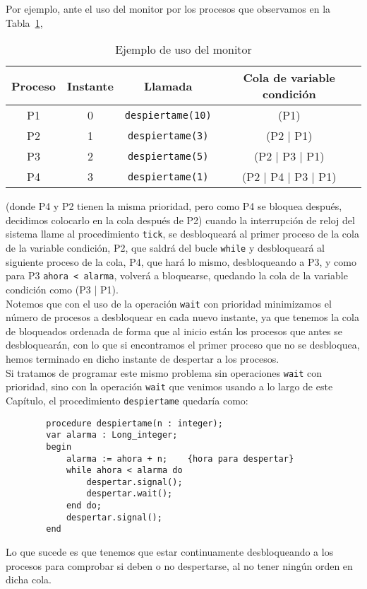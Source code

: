 \begin{ejemplo}
    Por ejemplo, ante el uso del monitor por los procesos que observamos en la Tabla~\ref{tab:ejm_uso_monitor},
    \begin{table}
    \centering
    \begin{tabular}{|c|c|c|c|}
        \hline
        Proceso & Instante & Llamada & Cola de variable condición \\
        \hline
        P1 & 0 & \verb|despiertame(10)| & (P1) \\
        \hline
        P2 & 1 & \verb|despiertame(3)| & (P2 | P1) \\
        \hline
        P3 & 2 & \verb|despiertame(5)| & (P2 | P3 | P1) \\
        \hline
        P4 & 3 & \verb|despiertame(1)| & (P2 | P4 | P3 | P1) \\
        \hline
    \end{tabular}
    \caption{Ejemplo de uso del monitor}
    \label{tab:ejm_uso_monitor}
    \end{table}
    (donde P4 y P2 tienen la misma prioridad, pero como P4 se bloquea después, decidimos colocarlo en la cola después de P2) cuando la interrupción de reloj del sistema llame al procedimiento \verb|tick|, se desbloqueará al primer proceso de la cola de la variable condición, P2, que saldrá del bucle \verb|while| y desbloqueará al siguiente proceso de la cola, P4, que hará lo mismo, desbloqueando a P3, y como para P3 \verb|ahora < alarma|, volverá a bloquearse, quedando la cola de la variable condición como (P3 | P1).\\

    Notemos que con el uso de la operación \verb|wait| con prioridad minimizamos el número de procesos a desbloquear en cada nuevo instante, ya que tenemos la cola de bloqueados ordenada de forma que al inicio están los procesos que antes se desbloquearán, con lo que si encontramos el primer proceso que no se desbloquea, hemos terminado en dicho instante de despertar a los procesos.\\

    Si tratamos de programar este mismo problema sin operaciones \verb|wait| con prioridad, sino con la operación \verb|wait| que venimos usando a lo largo de este Capítulo, el procedimiento \verb|despiertame| quedaría como:
    \begin{verbatim}
        procedure despiertame(n : integer);
        var alarma : Long_integer;
        begin
            alarma := ahora + n;    {hora para despertar}
            while ahora < alarma do 
                despertar.signal();
                despertar.wait();
            end do;
            despertar.signal();
        end
    \end{verbatim}
    Lo que sucede es que tenemos que estar continuamente desbloqueando a los procesos para comprobar si deben o no despertarse, al no tener ningún orden en dicha cola.
\end{ejemplo}

